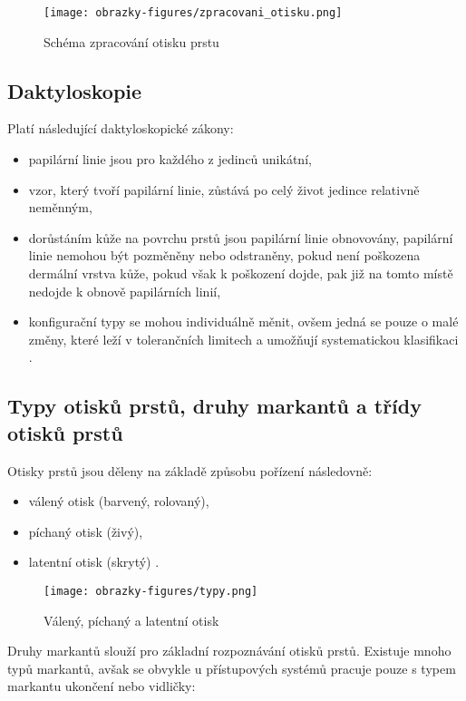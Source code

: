 \begin{figure}[!htbp]
    \centering
    \texttt{[image: obrazky-figures/zpracovani\_otisku.png]}
    \caption{Schéma zpracování otisku prstu \cite{BIOopora}}
    \label{fig:zpracovani}
\end{figure}

\subsection*{Daktyloskopie}
Platí následující daktyloskopické zákony:
\begin{itemize}
    \item papilární linie jsou pro každého z jedinců unikátní,
    \item vzor, který tvoří papilární linie, zůstává po celý život jedince relativně neměnným, 
    \item dorůstáním kůže na povrchu prstů jsou papilární linie obnovovány, papilární linie nemohou být pozměněny nebo odstraněny, pokud není poškozena dermální vrstva kůže, pokud však k poškození dojde, pak již na tomto místě nedojde k obnově papilárních linií,
    \item konfigurační typy se mohou individuálně měnit, ovšem jedná se pouze o malé změny, které leží v tolerančních limitech a umožňují systematickou klasifikaci \cite{BIOopora}.
\end{itemize}
\subsection*{Typy otisků prstů, druhy markantů a třídy otisků prstů}
Otisky prstů jsou děleny na základě způsobu pořízení následovně:
\begin{itemize}
\item válený otisk (barvený, rolovaný),
\item píchaný otisk (živý),
\item latentní otisk (skrytý) \cite{BIOopora}.
\end{itemize}

\begin{figure}[!htbp]
    \centering
    \texttt{[image: obrazky-figures/typy.png]}
    \caption{Válený, píchaný a latentní otisk \cite{BIOopora}}
\end{figure}

Druhy markantů slouží pro základní rozpoznávání otisků prstů. Existuje mnoho typů markantů, avšak se obvykle u přístupových systémů pracuje pouze s typem markantu ukončení nebo vidličky:

